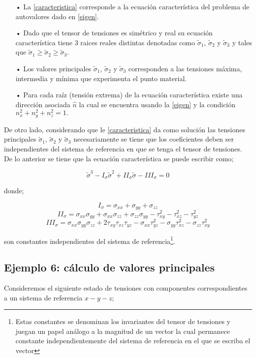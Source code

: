 \documentclass[../notas medios.tex]{subfiles}
\begin{document}
\begin{itemize}
\item[•] La \cref{caracteristica} corresponde a la ecuación  característica del problema de autovalores dado en \cref{eigen}.
\item[•] Dado que el tensor de tensiones es simétrico y real su ecuación característica tiene 3 raices reales distintas denotadas como ${{\tilde \sigma }_1}$, ${{\tilde \sigma }_2}$ y ${{\tilde \sigma }_3}$ y tales que ${{\tilde \sigma }_1} \geq{{\tilde \sigma }_2} \geq {{\tilde \sigma }_3}$.
\item[•] Los valores principales ${{\tilde \sigma }_1}$, ${{\tilde \sigma }_2}$ y ${{\tilde \sigma }_3}$ corresponden a las tensiones máxima, intermedia y mínima que experimenta el punto material. 
\item[•] Para cada raíz (tensión extrema) de la ecuación característica existe una dirección asociada $\hat{n}$ la cual se encuentra usando la \cref{eigen} y la condición $n_x^2 + n_y^2 + n_z^2 = 1.$
\end{itemize}

De otro lado, considerando que le \cref{caracteristica} da como solución las tensiones principales ${{\tilde \sigma }_1}$, ${{\tilde \sigma }_2}$ y ${{\tilde \sigma }_3}$ necesariamente se tiene que los coeficientes deben ser independientes del sistema de referencia en que se tenga el tensor de tensiones. De lo anterior se tiene que la ecuación característica se puede escribir como;

\[{{\tilde \sigma }^3} - {I_\sigma }{{\tilde \sigma }^2} + I{I_\sigma }\tilde \sigma  - II{I_\sigma } = 0\]

donde;

\[{I_\sigma } = {\sigma _{xx}} + {\sigma _{yy}} + {\sigma _{zz}}\]
\[I{I_\sigma } = {\sigma _{xx}}{\sigma _{yy}} + {\sigma _{xx}}{\sigma _{zz}} + {\sigma _{zz}}{\sigma _{yy}} - \tau _{xy}^2 - \tau _{xz}^2 - \tau _{yz}^2\]
\[II{I_\sigma } = {\sigma _{xx}}{\sigma _{yy}}{\sigma _{zz}} + 2{\tau _{xy}}{\tau _{xz}}{\tau _{yz}} - {\sigma _{xx}}\tau _{yz}^2 - {\sigma _{yy}}\tau _{xz}^2 - {\sigma _{zz}}\tau _{xy}^2\]

son constantes independientes del sistema de referencia\footnote{Estas constantes se denominan los invariantes del tensor de tensiones y juegan un papel análogo a la magnitud de un vector la cual permanece constante independientemente del sistema de referencia en el que se escriba el vector}.

\subsection*{Ejemplo 6: cálculo de valores principales}
Consideremos el siguiente estado de tensiones con componentes correspondientes a un sistema de referencia $x-y-z$;
\end{document}
